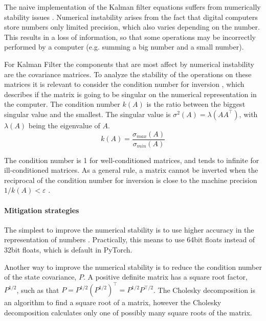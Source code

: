 \documentclass{article}
\begin{document}
The naive implementation of the Kalman filter equations suffers from numerically stability issues \cite{mohinder_s_grewal_kalman_2001, dan_simon_optimal_2006}. %
Numerical instability arises from the fact that digital computers store numbers only limited precision, which also varies depending on the number. This results in a loss of information, so that some operations may be incorrectly performed by a  computer (e.g. summing a big number and a small number).

For Kalman Filter the components that are most affect by numerical instability are the covariance matrices. To analyze the stability of the operations on these matrices it is relevant to consider the condition number for inversion \cite{mohinder_s_grewal_kalman_2001, kaminski_discrete_1971}, which describes if the matrix is going to be singular on the numerical representation in the computer. The condition number $k(A)$ is the ratio between the biggest singular value and the smallest. The singular value is $\sigma^2(A) = \lambda(AA^\top)$, with  $\lambda(A)$ being the eigenvalue of $A$.
\begin{equation*}%
    k(A) = \frac{\sigma_{max}(A)}{\sigma_{min}(A)}
\end{equation*}

The condition number is 1 for well-conditioned matrices, and tends to infinite for ill-conditioned matrices. As a general rule,  a matrix cannot be inverted when the reciprocal of the condition number for inversion is close to the machine precision $ 1/k(A) < \varepsilon$ \cite{mohinder_s_grewal_kalman_2001}.

\paragraph{Mitigation strategies}
The simplest to improve the numerical stability is to use higher accuracy in the representation of numbers \cite{dan_simon_optimal_2006}. Practically, this means to use 64bit floats instead of 32bit floats, which is default in \textsf{PyTorch}.

Another way to improve the numerical stability is to reduce the condition number of the state covariance, $P$. A positive definite matrix has a square root factor, $P^{1/2}$, such as that $P = P^{1/2}(P^{1/2})^\top=P^{1/2}P^{\top/2}$.
The Cholesky decomposition is an algorithm to find a square root of a matrix, however the Cholesky decomposition calculates only one of possibly many square roots of the matrix.
\end{document}
